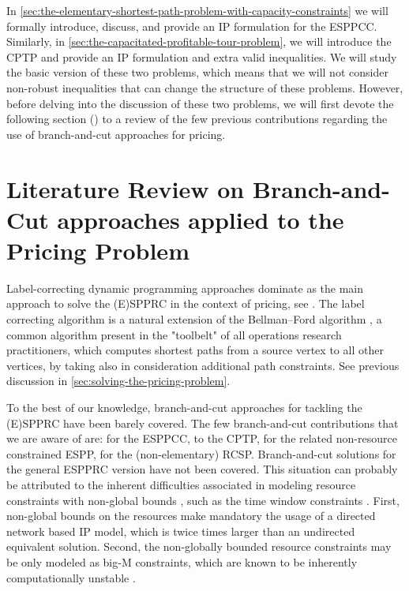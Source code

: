 \medskip

In \cref{sec:the-elementary-shortest-path-problem-with-capacity-constraints}
we will formally introduce, discuss, and provide an IP formulation for the ESPPCC.
Similarly, in \cref{sec:the-capacitated-profitable-tour-problem},
we will introduce the CPTP and provide an IP formulation and extra valid inequalities.
We will study the basic version of these two problems,
which means that we will not consider non-robust inequalities
that can change the structure of these problems.
However, before delving into the discussion of these two problems,
we will first devote the following section ()
to a review of the few previous contributions regarding
the use of branch-and-cut approaches for pricing.

\section{Literature Review on Branch-and-Cut approaches applied to the Pricing Problem}
\label{sec:bac-approaches-for-the-pricing-problem}

Label-correcting dynamic programming approaches
dominate as the main approach to solve the (E)SPPRC in the context of pricing,
see \cite{desrochers1992, feillet2004, righini2004, righini2006, boland2006, righini2008, pugliese2010, baldacci2011, lozano2013, lozano2016, sadykov2021bucket}.
The label correcting algorithm is a natural extension of the Bellman–Ford algorithm \parencite{bellman1958, fordjr1956},
a common algorithm present in the "toolbelt" of all operations research practitioners,
which computes shortest paths from a source vertex to all other vertices,
by taking also in consideration additional path constraints.
See previous discussion in \cref{sec:solving-the-pricing-problem}.

To the best of our knowledge,
branch-and-cut approaches for tackling the (E)SPPRC have been barely covered.
The few branch-and-cut contributions that we are aware of are:
\textcite{jepsen2008branchandcut} for the ESPPCC,
\textcite{jepsen2011,jepsen2014} to the CPTP,
\textcite{taccari2016, drexl2014} for the related non-resource constrained ESPP,
\textcite{horvath2016} for the (non-elementary) RCSP.
Branch-and-cut solutions for the general ESPPRC version have not been covered.
This situation can probably be attributed to the
inherent difficulties associated in modeling
resource constraints with non-global bounds \parencite{jepsen2008branchandcut},
such as the time window constraints .
First, non-global bounds on the resources make mandatory the usage of
a directed network based IP model,
which is twice times larger than an undirected equivalent solution.
Second, the non-globally bounded resource constraints may be only modeled as
big-M constraints, which are known to be inherently computationally unstable \parencite{jepsen2008branchandcut}.

